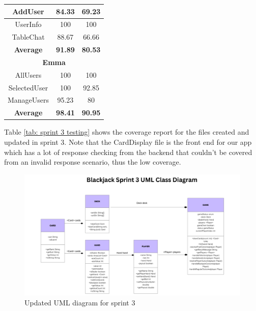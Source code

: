 \begin{table}[!hbt]
\begin{tabular}{|ccc|}
\multicolumn{1}{|c|}{AddUser}          & \multicolumn{1}{c|}{84.33}          & 69.23          \\ \hline
\multicolumn{1}{|c|}{UserInfo}         & \multicolumn{1}{c|}{100}            & 100            \\ \hline
\multicolumn{1}{|c|}{TableChat}        & \multicolumn{1}{c|}{88.67}          & 66.66          \\ \hline
\multicolumn{1}{|c|}{\textbf{Average}} & \multicolumn{1}{c|}{\textbf{91.89}} & \textbf{80.53} \\ \hline
\multicolumn{3}{|c|}{\textbf{Emma}}                                                           \\ \hline
\multicolumn{1}{|c|}{AllUsers}         & \multicolumn{1}{c|}{100}            & 100            \\ \hline
\multicolumn{1}{|c|}{SelectedUser}     & \multicolumn{1}{c|}{100}            & 92.85          \\ \hline
\multicolumn{1}{|c|}{ManageUsers}      & \multicolumn{1}{c|}{95.23}          & 80             \\ \hline
\multicolumn{1}{|c|}{\textbf{Average}} & \multicolumn{1}{c|}{\textbf{98.41}} & \textbf{90.95} \\ \hline
\end{tabular}
\end{table}

\noindent Table \ref{tab: sprint 3 testing} shows the coverage report for the files created and updated in sprint 3. Note that the CardDisplay file is the front end for our app which has a lot of response checking from the backend that couldn't be covered from an invalid response scenario, thus the low coverage.

\pagebreak


\begin{figure}
    \centering
    \includegraphics[width=1.0\linewidth]{figures/Sprint_3_UML_Diagram.png}
    \caption{Updated UML diagram for sprint 3}
    \label{fig:sprint 3 UML}
\end{figure}

